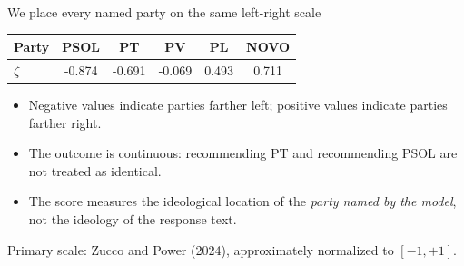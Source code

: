 \documentclass[aspectratio=169,11pt]{beamer}
\newcommand{\source}[1]{\vfill{\fontsize{8}{10}\selectfont\color{muted}#1}}
\begin{document}
\begin{frame}{We place every named party on the same left-right scale}
\begin{center}
\begin{tabular}{lccccc}\toprule
Party&PSOL&PT&PV&PL&NOVO\\\midrule
\(\zeta\)&-0.874&-0.691&-0.069&0.493&0.711\\\bottomrule
\end{tabular}
\end{center}
\vspace{.18cm}
\begin{itemize}
\item Negative values indicate parties farther left; positive values indicate parties farther right.
\item The outcome is continuous: recommending PT and recommending PSOL are not treated as identical.
\item The score measures the ideological location of the \emph{party named by the model}, not the ideology of the response text.
\end{itemize}
\source{Primary scale: Zucco and Power (2024), approximately normalized to \([-1,+1]\).}
\end{frame}
\end{document}
